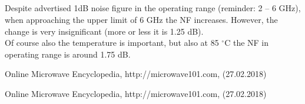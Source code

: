 \documentclass[eng,printmode]{mgr}
\begin{document}
\subsection*{}
Despite advertised 1dB noise figure in the operating range (reminder: 2 -- 6 GHz), when approaching the upper limit of 6 GHz the NF increases. However, the change is very insignificant (more or less it is 1.25 dB).\\
Of course also the temperature is important, but also at 85 $^\circ$C
the NF in operating range is around 1.75 dB.
\begin{thebibliography}{9}
 Online Microwave Encyclopedia, http://microwave101.com,  (27.02.2018)
\end{thebibliography}
	\begin{thebibliography}{9}
		 Online Microwave Encyclopedia, http://microwave101.com,  (27.02.2018)
	\end{thebibliography}
\end{document}
